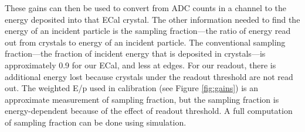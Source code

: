 These gains can then be used to convert from ADC counts in a channel to the energy deposited into that ECal crystal.
The other information needed to find the energy of an incident particle is the sampling fraction---the ratio of energy read out from crystals to energy of an incident particle.
The conventional sampling fraction---the fraction of incident energy that is deposited in crystals---is approximately 0.9 for our ECal, and less at edges.
For our readout, there is additional energy lost because crystals under the readout threshold are not read out.
The weighted E/p used in calibration (see Figure \ref{fig:gains}) is an approximate measurement of sampling fraction, but the sampling fraction is energy-dependent because of the effect of readout threshold. 
A full computation of sampling fraction can be done using simulation.
